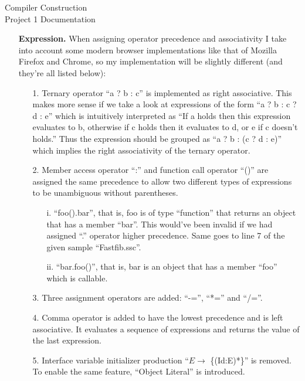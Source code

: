 \documentclass[12pt]{article}
\begin{document}
\begin{center}
  \Large{Compiler Construction}\\
  \large{Project 1 Documentation}
\end{center}

\begin{center}
\begin{itemize}
\item[{\bf Expression.}] When assigning operator precedence and associativity I take into
  account some modern browser implementations like that of Mozilla Firefox and Chrome, so
  my implementation will be slightly different (and they're all listed below):
  \begin{itemize}
  \item[1.] Ternary operator ``a ? b : c'' is implemented as right associative. This makes
    more sense if we take a look at expressions of the form ``a ? b : c ? d : e'' which is
    intuitively interpreted as ``If a holds then this expression evaluates to b, otherwise
    if c holds then it evaluates to d, or e if c doesn't holds.'' Thus the expression should
    be grouped as ``a ? b : (c ? d : e)'' which implies the right associativity of the
    ternary operator.
  \item[2.] Member access operator ``:'' and function call operator ``()'' are assigned the
    same precedence to allow two different types of expressions to be unambiguous without
    parentheses.
    \begin{itemize}
    \item[]
    \item[i.] ``foo().bar'', that is, foo is of type ``function'' that returns an object that
      has a member ``bar''. This would've been invalid if we had assigned ``.'' operator higher
      precedence. Same goes to line 7 of the given sample ``Fastfib.ssc''.
    \item[ii.] ``bar.foo()'', that is, bar is an object that has a member ``foo'' which is
      callable.
    \end{itemize}
  \item[3.] Three assignment operators are added: ``-='', ``*='' and ``/=''.
  \item[4.] Comma operator is added to have the lowest precedence and is left associative.
    It evaluates a sequence of expressions and returns the value of the last expression.
  \item[5.] Interface variable initializer production ``$E \rightarrow$ \{(Id:E)*\}'' is
    removed. To enable the same feature, ``Object Literal'' is introduced.

\end{itemize}
\end{itemize}
\end{center}
\end{document}
